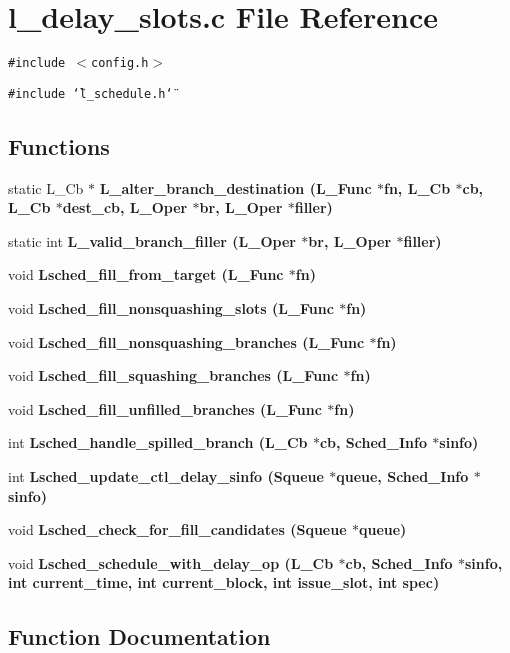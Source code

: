 \section{l\_\-delay\_\-slots.c File Reference}
\label{l__delay__slots_8c}
{\tt \#include $<$config.h$>$}\par
{\tt \#include \char`\"{}l\_\-schedule.h\char`\"{}}\par
\subsection*{Functions}
\begin{CompactItemize}
\item 
static L\_\-Cb $\ast$ \bf{L\_\-alter\_\-branch\_\-destination} (L\_\-Func $\ast$fn, L\_\-Cb $\ast$cb, L\_\-Cb $\ast$dest\_\-cb, L\_\-Oper $\ast$br, L\_\-Oper $\ast$filler)
\item 
static int \bf{L\_\-valid\_\-branch\_\-filler} (L\_\-Oper $\ast$br, L\_\-Oper $\ast$filler)
\item 
void \bf{Lsched\_\-fill\_\-from\_\-target} (L\_\-Func $\ast$fn)
\item 
void \bf{Lsched\_\-fill\_\-nonsquashing\_\-slots} (L\_\-Func $\ast$fn)
\item 
void \bf{Lsched\_\-fill\_\-nonsquashing\_\-branches} (L\_\-Func $\ast$fn)
\item 
void \bf{Lsched\_\-fill\_\-squashing\_\-branches} (L\_\-Func $\ast$fn)
\item 
void \bf{Lsched\_\-fill\_\-unfilled\_\-branches} (L\_\-Func $\ast$fn)
\item 
int \bf{Lsched\_\-handle\_\-spilled\_\-branch} (L\_\-Cb $\ast$cb, \bf{Sched\_\-Info} $\ast$sinfo)
\item 
int \bf{Lsched\_\-update\_\-ctl\_\-delay\_\-sinfo} (\bf{Squeue} $\ast$queue, \bf{Sched\_\-Info} $\ast$sinfo)
\item 
void \bf{Lsched\_\-check\_\-for\_\-fill\_\-candidates} (\bf{Squeue} $\ast$queue)
\item 
void \bf{Lsched\_\-schedule\_\-with\_\-delay\_\-op} (L\_\-Cb $\ast$cb, \bf{Sched\_\-Info} $\ast$sinfo, int \bf{current\_\-time}, int current\_\-block, int issue\_\-slot, int spec)
\end{CompactItemize}


\subsection{Function Documentation}
